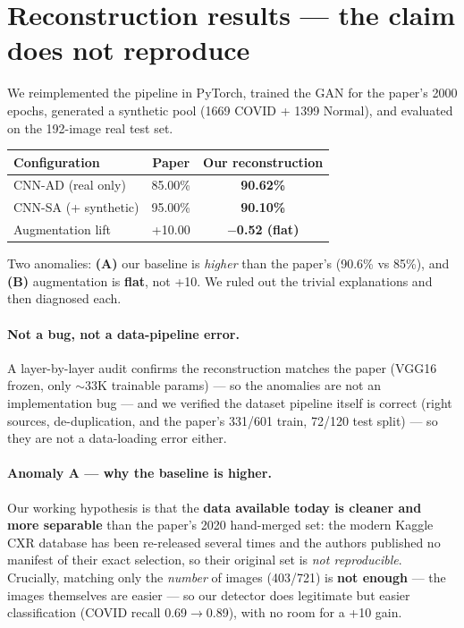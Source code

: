 \documentclass[11pt]{article}
\begin{document}
\section{Reconstruction results --- the claim does not reproduce}
\label{sec:recon}
We reimplemented the pipeline in PyTorch, trained the GAN for the paper's 2000
epochs, generated a synthetic pool (1669 COVID + 1399 Normal), and evaluated on the
192-image real test set.

\begin{table}[htbp]\centering
\begin{tabular}{@{}lcc@{}}\toprule
\textbf{Configuration} & \textbf{Paper} & \textbf{Our reconstruction} \\ \midrule
CNN-AD (real only)   & 85.00\% & \textbf{90.62\%} \\
CNN-SA (+ synthetic) & 95.00\% & \textbf{90.10\%} \\
Augmentation lift    & +10.00  & \textbf{$-$0.52 (flat)} \\ \bottomrule
\end{tabular}\end{table}

\noindent Two anomalies: \textbf{(A)} our baseline is \emph{higher} than the paper's
(90.6\% vs 85\%), and \textbf{(B)} augmentation is \textbf{flat}, not +10. We ruled
out the trivial explanations and then diagnosed each.

\paragraph{Not a bug, not a data-pipeline error.} A layer-by-layer audit confirms the
reconstruction matches the paper (VGG16 frozen, only $\sim$33K trainable params) ---
so the anomalies are not an implementation bug --- and we verified the dataset
pipeline itself is correct (right sources, de-duplication, and the paper's 331/601
train, 72/120 test split) --- so they are not a data-loading error either.

\paragraph{Anomaly A --- why the baseline is higher.} Our working hypothesis is that
the \textbf{data available today is cleaner and more separable} than the paper's 2020
hand-merged set: the modern Kaggle CXR database has been re-released several times and
the authors published no manifest of their exact selection, so their original set is
\emph{not reproducible}. Crucially, matching only the \emph{number} of images
(403/721) is \textbf{not enough} --- the images themselves are easier --- so our
detector does legitimate but easier classification (COVID recall 0.69$\to$0.89), with
no room for a +10 gain.
\end{document}

